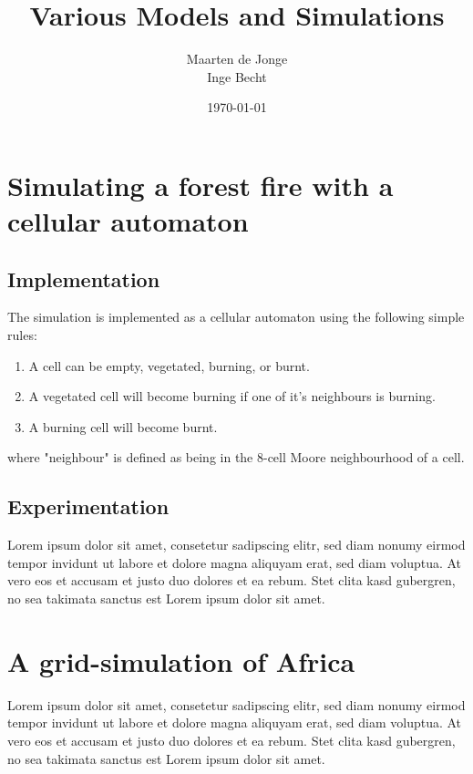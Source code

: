 \documentclass[a4paper]{report}
\author{Maarten de Jonge \\
        Inge Becht}
\date{\today}
\title{Various Models and Simulations}
\begin{document}
\maketitle

\chapter{Simulating a forest fire with a cellular automaton}
\label{cha:ff}

\section{Implementation} 
\label{sec:ff_impl}

The simulation is implemented as a cellular automaton using the following simple
rules:
\begin{enumerate}
    \item A cell can be empty, vegetated, burning, or burnt.
    \item A vegetated cell will become burning if one of it's neighbours is
          burning.
    \item A burning cell will become burnt.
\end{enumerate}
where "neighbour" is defined as being in the 8-cell Moore neighbourhood of a
cell.


\section{Experimentation} 
\label{sec:ff_exp}

Lorem ipsum dolor sit amet, consetetur sadipscing elitr, sed diam nonumy eirmod
tempor invidunt ut labore et dolore magna aliquyam erat, sed diam voluptua. At
vero eos et accusam et justo duo dolores et ea rebum. Stet clita kasd gubergren,
no sea takimata sanctus est Lorem ipsum dolor sit amet.



\chapter{A grid-simulation of Africa}
\label{cha:mlaria}

Lorem ipsum dolor sit amet, consetetur sadipscing elitr, sed diam nonumy eirmod
tempor invidunt ut labore et dolore magna aliquyam erat, sed diam voluptua. At
vero eos et accusam et justo duo dolores et ea rebum. Stet clita kasd gubergren,
no sea takimata sanctus est Lorem ipsum dolor sit amet.

\end{document}
